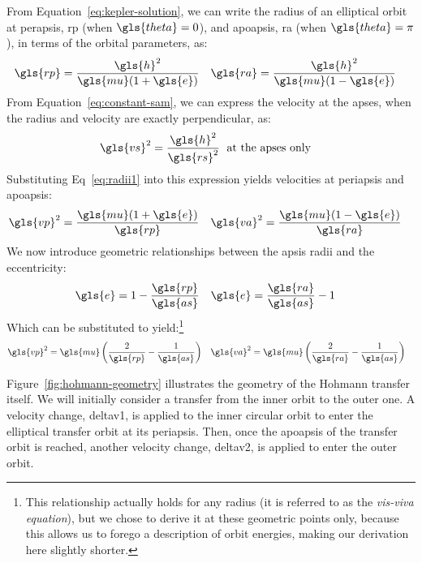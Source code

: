\documentclass[12pt,openany]{book}
\begin{document}
From Equation~\ref{eq:kepler-solution}, we can write the radius of an elliptical orbit at perapsis, \gls{rp} (when \(\gls{theta}=0\)), and apoapsis, \gls{ra} (when \(\gls{theta}=\pi\)), in terms of the orbital parameters, as:
\begin{align}
  \gls{rp} &= \frac{\gls{h}^2}{\gls{mu}(1+\gls{e})} &
  \gls{ra} &= \frac{\gls{h}^2}{\gls{mu}(1-\gls{e})} \label{eq:radii1}
\end{align}
From Equation~\ref{eq:constant-sam}, we can express the velocity at the apses, when the radius and velocity are exactly perpendicular, as:
\begin{align}
  \gls{vs}^2 &= \frac{\gls{h}^2}{\gls{rs}^2}\;\textrm{ at the apses only}
\end{align}
Substituting Eq~\ref{eq:radii1} into this expression yields velocities at periapsis and apoapsis:
\begin{align}
  \gls{vp}^2 &= \frac{\gls{mu}(1+\gls{e})}{\gls{rp}} &
  \gls{va}^2 &= \frac{\gls{mu}(1-\gls{e})}{\gls{ra}}
\end{align}
We now introduce geometric relationships between the apsis radii and the eccentricity:
\begin{align}
  \gls{e} &= 1 - \frac{\gls{rp}}{\gls{as}} &
  \gls{e} &= \frac{\gls{ra}}{\gls{as}} - 1
\end{align}
Which can be substituted to yield:\footnote{This relationship actually holds for any radius (it is referred to as the \emph{vis-viva equation}), but we chose to derive it at these geometric points only, because this allows us to forego a description of orbit energies, making our derivation here slightly shorter.}
\begin{align}
  \gls{vp}^2 &= \gls{mu}\left(\frac{2}{\gls{rp}}-\frac{1}{\gls{as}}\right) &
  \gls{va}^2 &= \gls{mu}\left(\frac{2}{\gls{ra}}-\frac{1}{\gls{as}}\right) &
\end{align}

Figure~\ref{fig:hohmann-geometry} illustrates the geometry of the Hohmann transfer itself. We will initially consider a transfer from the inner orbit to the outer one. A velocity change, \gls{deltav1}, is applied to the inner circular orbit to enter the elliptical transfer orbit at its periapsis. Then, once the apoapsis of the transfer orbit is reached, another velocity change, \gls{deltav2}, is applied to enter the outer orbit.
\end{document}
